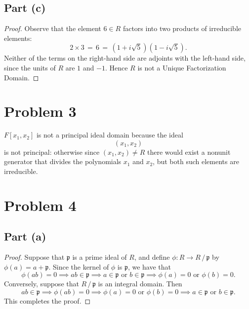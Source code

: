 \documentclass[11pt]{article}
\begin{document}

\subsection*{Part (c)}

\begin{proof}
  Observe that the element $6 \in R$ factors into two products of irreducible elements:
  \[
    2 \times 3 \, = \, 6 \, = \, (1 + i\sqrt{5})(1 - i\sqrt{5}).
  \]
  Neither of the terms on the right-hand side are adjoints with the left-hand side, since the units of $R$ are $1$ and $-1$. Hence $R$ is not a Unique Factorization Domain.
\end{proof}


\section{Problem 3}

$F[x_{1}, x_{2}]$ is not a principal ideal domain because the ideal
\[
  (x_{1}, x_{2})
\]
is not principal: otherwise since $(x_{1}, x_{2}) \ne R$ there would exist a nonunit generator that divides the polynomials $x_{1}$ and $x_{2}$, but both such elements are irreducible.


\section{Problem 4}


\subsection*{Part (a)}

\begin{proof}
	Suppose that $\mathfrak{p}$ is a prime ideal of $R$, and define $\phi : R \to R \,/\, \mathfrak{p}$ by $\phi(a) = a + \mathfrak{p}$. Since the kernel of $\phi$ is $\mathfrak{p}$, we have that
	\[
		\phi(ab) = 0 \implies ab \in \mathfrak{p} \implies a \in \mathfrak{p} \text{ or } b \in \mathfrak{p} \implies \phi(a) = 0 \text{ or } \phi(b) = 0.
	\]
	Conversely, suppose that $R \,/\, \mathfrak{p}$ is an integral domain. Then
	\[
		ab \in \mathfrak{p} \implies \phi(ab) = 0 \implies \phi(a) = 0 \text{ or } \phi(b) = 0 \implies a \in \mathfrak{p} \text{ or } b \in \mathfrak{p}.
	\]
	This completes the proof.
\end{proof}
\end{document}
